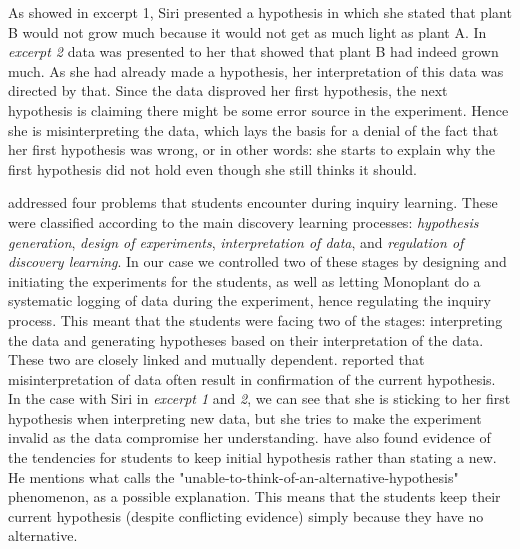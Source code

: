 As showed in excerpt 1, Siri presented a hypothesis in which she stated that plant B would not grow much because it would not get as much light as plant A. In \emph{excerpt 2} data was presented to her that showed that plant B had indeed grown much. As she had already made a hypothesis, her interpretation of this data was directed by that. Since the data disproved her first hypothesis, the next hypothesis is claiming there might be some error source in the experiment. Hence she is misinterpreting the data, which lays the basis for a denial of the fact that her first hypothesis was wrong, or in other words: she starts to explain why the first hypothesis did not hold even though she still thinks it should.

\citet{de1998scientific} addressed four problems that students encounter during inquiry learning. These were classified according to the main discovery learning processes: \textit{hypothesis generation}, \textit{design of experiments}, \textit{interpretation of data}, and \textit{regulation of discovery learning}. In our case we controlled two of these stages by designing and initiating the experiments for the students, as well as letting Monoplant do a systematic logging of data during the experiment, hence regulating the inquiry process. This meant that the students were facing two of the stages: interpreting the data and generating hypotheses based on their interpretation of the data. These two are closely linked and mutually dependent. \citeauthor*{klahr1993heuristics} \citetext{\citeyear{klahr1993heuristics}, referenced in \citealp{de1998scientific}} reported that misinterpretation of data often result in confirmation of the current hypothesis. In the case with Siri in \emph{excerpt 1} and \emph{2}, we can see that she is sticking to her first hypothesis when interpreting new data, but she tries to make the experiment invalid as the data compromise her understanding. \citeauthor*{dunbar1993concept} \citetext{\citeyear{dunbar1993concept}, referenced in \citealp{de1998scientific}} have also found evidence of the tendencies for students to keep initial hypothesis rather than stating a new. He mentions what calls the "unable-to-think-of-an-alternative-hypothesis" phenomenon, as a possible explanation. This means that the students keep their current hypothesis (despite conflicting evidence) simply because they have no alternative.

